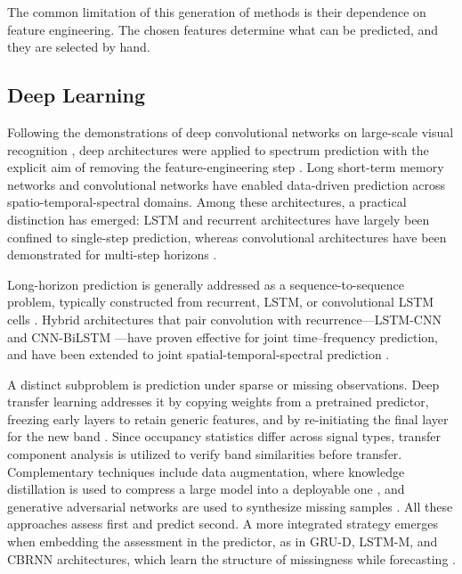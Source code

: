 \documentclass[lettersize,journal]{IEEEtran}
\begin{document}
The common limitation of this generation of methods is their dependence on feature
engineering. The chosen features determine what can be predicted, and they are
selected by hand.

\subsection{\textbf{Deep Learning}}
Following the demonstrations of deep convolutional networks on
large-scale visual recognition \cite{Krizhevsky2012}, deep architectures
were applied to spectrum prediction with the explicit aim of removing
the feature-engineering step \cite{Wang2024}.
Long short-term memory networks \cite{Wang2017,Ozyegen2020} and convolutional
networks \cite{Jia2020} have enabled data-driven prediction across
spatio-temporal-spectral domains.
Among these architectures, a practical distinction has 
emerged: LSTM and recurrent architectures have
largely been confined to single-step prediction, whereas convolutional
architectures have been demonstrated for multi-step horizons \cite{Yu2018}.

Long-horizon prediction is generally addressed as a sequence-to-sequence
problem, typically constructed from recurrent, LSTM, or convolutional
LSTM cells \cite{Wang2024}.
Hybrid architectures that pair convolution with recurrence---LSTM-CNN
\cite{Zhang2021} and CNN-BiLSTM \cite{Ding2020}---have proven effective for
joint time--frequency prediction, and have been extended to joint
spatial-temporal-spectral prediction \cite{Shawel2019, Wen2023}.

A distinct subproblem is prediction under sparse or missing
observations.
Deep transfer learning addresses it by copying weights
from a pretrained predictor, freezing early layers to retain generic
features, and by re-initiating the final layer for the new band
\cite{Li2023}.
Since occupancy statistics differ across signal types,
transfer component analysis is utilized to verify band similarities before
transfer.
Complementary techniques include data augmentation, where knowledge
distillation is used to compress a large model into a deployable one
\cite{Cheng2023, Hinton2015}, and generative adversarial networks are used to
synthesize missing samples \cite{Lin2021}.
All these approaches assess first and predict second. A more integrated strategy
emerges when embedding the assessment in the predictor, as in GRU-D, LSTM-M,
and CBRNN architectures, which learn the structure of missingness while
forecasting \cite{Wang2024}.
\end{document}

